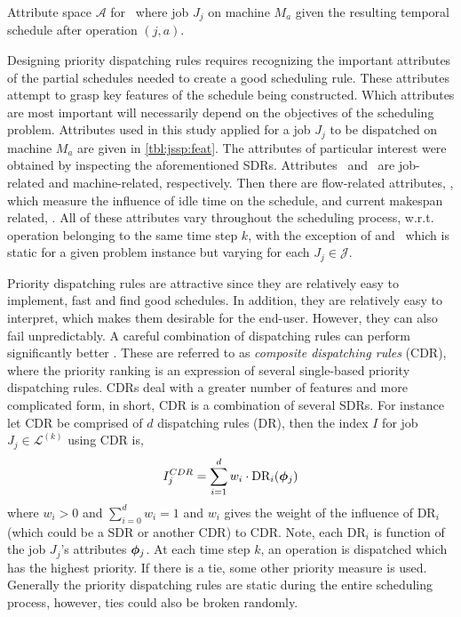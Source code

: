 \documentclass[smallextended]{svjour3}
\begin{document}
\begin{table}[t!] \centering
	\caption[Attribute space $\mathcal{A}$ for \JSP]{Attribute space 
	$\mathcal{A}$ for \JSP~where job $J_j$ on machine $M_a$ given the resulting 
	temporal schedule after operation $(j,a)$.
	}
	\label{tbl:jssp:feat}
	
\end{table}

Designing priority dispatching rules requires recognizing the important 
attributes of the partial schedules needed to create a good scheduling rule. 
These attributes attempt to grasp key features of the schedule being 
constructed. Which attributes are most important will necessarily depend on the
objectives of the scheduling problem. Attributes used in this study applied for 
a job $J_j$ to be dispatched on machine $M_a$ are given in \cref{tbl:jssp:feat}.
The attributes of particular interest were obtained by inspecting the 
aforementioned SDRs. Attributes \phiJobRelated\ and \phiMacRelated\ are 
job-related and machine-related, respectively. 
Then there are flow-related attributes, \phiFlowRelated, which measure the 
influence of idle time on the schedule, and current makespan related, 
\phiScheduleRelated.
All of these attributes vary throughout the scheduling process, w.r.t. 
operation belonging to the same time step $k$, with the exception of 
and \phitotalProc\ which is static for a given problem instance but varying for 
each $J_j\in\mathcal{J}$. 

Priority dispatching rules are attractive since they are relatively easy to 
implement, 
fast and find good schedules. In addition, they are relatively easy to 
interpret, which makes them desirable for the end-user.
However, they can also fail unpredictably. 
A careful combination of dispatching rules can perform significantly better 
\cite{Jayamohan04}. These are referred to as \emph{composite dispatching rules} 
(CDR), where the priority ranking is an expression of several single-based 
priority dispatching rules. CDRs deal with a greater number of features and 
more complicated form, in short, CDR is a combination of several SDRs. For 
instance let CDR be comprised of $d$ dispatching rules (DR), then the index $I$ 
for job $J_j\in\mathcal{L}^{(k)}$ using CDR is, 
\begin{equation}
	I_j^{CDR} = \sum_{i=1}^d w_i \cdot \text{DR}_i(\bm{\phi}_j) \label{eq:CDR}
\end{equation}
where $w_i>0$ and $\sum_{i=0}^d w_i = 1$ and $w_i$ gives the weight of the 
influence of $\text{DR}_i$ (which could be a SDR or another CDR) to CDR. Note, 
each $\text{DR}_i$ is function of the job $J_j$'s attributes $\bm{\phi}_j$.  
At each time step $k$, an operation is dispatched which has the highest 
priority.  If there is a 
tie, some other priority measure is used. Generally the priority dispatching 
rules are static during the entire scheduling process, however, ties could also be broken randomly. 
\end{document}
